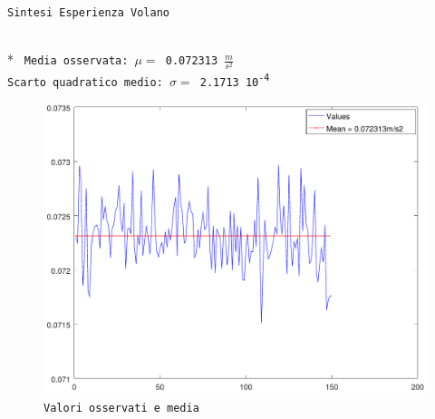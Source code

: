 \documentclass[10pt,a4paper]{report}
\begin{document}
\large
\begin{center}
	{\texttt{Sintesi Esperienza Volano}}
\end{center}
\normalsize
\mbox{}\\*
\texttt{
Media osservata: $\mu = $ 0.072313 $\frac{m}{s^2}$\\
Scarto quadratico medio: $\sigma = $ 2.1713 10\textsuperscript{-4}\\
}
\begin{figure}[h]
\centering
\includegraphics[width=0.7\linewidth]{valuesPlot.png}
\caption*{\texttt{Valori osservati e media}}
\label{fig:valuesplot}
\end{figure}
\end{document}
